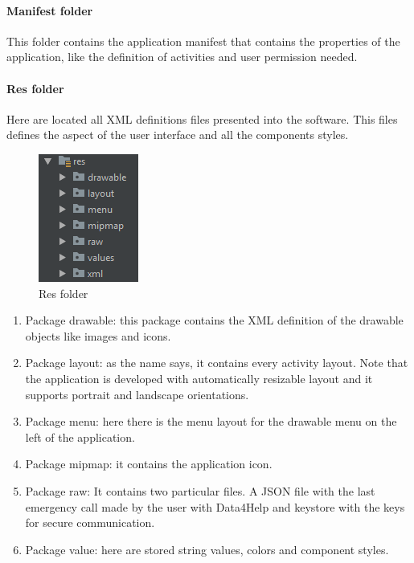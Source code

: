 \paragraph{Manifest folder}
This folder contains the application manifest that contains the properties of the application, like the definition of activities and user permission needed. 

\paragraph{Res folder}
Here are located all XML definitions files presented into the software. 
This files defines the aspect of the user interface and all the components styles.

\begin{figure}[H]
\includegraphics[width=0.6\linewidth]{images/Res.png}
\centering
\caption{ Res folder }
\label{fig:pkgsharedata}
\end{figure}

\begin{enumerate}
\item Package drawable: this package contains the XML definition of the drawable objects like images and icons.
\item Package layout: as the name says, it contains every activity layout. 
Note that the application is developed with automatically resizable layout and it supports portrait and landscape orientations.
\item Package menu: here there is the menu layout for the drawable menu on the left of the application.
\item Package mipmap: it contains the application icon.
\item Package raw: It contains two particular files. A JSON file with the last emergency call made by the user with Data4Help and keystore with the keys for secure communication.
\item Package value: here are stored string values, colors and component styles. 
\end{enumerate}

